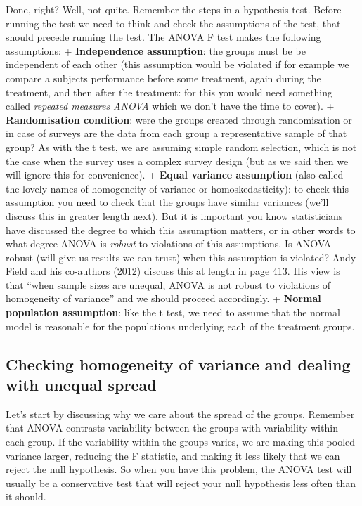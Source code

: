 \documentclass[
]{book}
\begin{document}
Done, right? Well, not quite. Remember the steps in a hypothesis test. Before running the test we need to think and check the assumptions of the test, that should precede running the test. The ANOVA F test makes the following assumptions:
+ \textbf{Independence assumption}: the groups must be be independent of each other (this assumption would be violated if for example we compare a subjects performance before some treatment, again during the treatment, and then after the treatment: for this you would need something called \emph{repeated measures ANOVA} which we don't have the time to cover).
+ \textbf{Randomisation condition}: were the groups created through randomisation or in case of surveys are the data from each group a representative sample of that group? As with the t test, we are assuming simple random selection, which is not the case when the survey uses a complex survey design (but as we said then we will ignore this for convenience).
+ \textbf{Equal variance assumption} (also called the lovely names of homogeneity of variance or homoskedasticity): to check this assumption you need to check that the groups have similar variances (we'll discuss this in greater length next). But it is important you know statisticians have discussed the degree to which this assumption matters, or in other words to what degree ANOVA is \emph{robust} to violations of this assumptions. Is ANOVA robust (will give us results we can trust) when this assumption is violated? Andy Field and his co-authors (2012) discuss this at length in page 413. His view is that ``when sample sizes are unequal, ANOVA is not robust to violations of homogeneity of variance'' and we should proceed accordingly.
+ \textbf{Normal population assumption}: like the t test, we need to assume that the normal model is reasonable for the populations underlying each of the treatment groups.

\hypertarget{checking-homogeneity-of-variance-and-dealing-with-unequal-spread}{%
\subsection{Checking homogeneity of variance and dealing with unequal spread}\label{checking-homogeneity-of-variance-and-dealing-with-unequal-spread}}

Let's start by discussing why we care about the spread of the groups. Remember that ANOVA contrasts variability between the groups with variability within each group. If the variability within the groups varies, we are making this pooled variance larger, reducing the F statistic, and making it less likely that we can reject the null hypothesis. So when you have this problem, the ANOVA test will usually be a conservative test that will reject your null hypothesis less often than it should.
\end{document}
